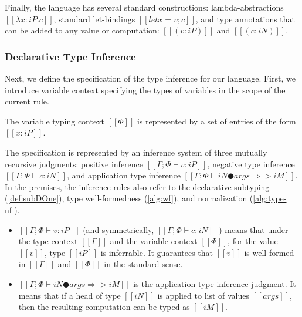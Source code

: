 Finally, the language has several standard constructions:
lambda-abstractions $[[λx:iP.c]]$,
standard let-bindings $[[let x = v; c]]$,
and type annotations that can be added to any value or computation:
$[[(v:iP)]]$ and $[[(c:iN)]]$.

\subsubsection{Declarative Type Inference}

Next, we define the specification of the type 
inference for our language. First, we introduce 
variable context specifying the types of variables 
in the scope of the current rule. 

\begin{definition}
  The variable typing context $[[Φ]]$
  is represented by a set of entries of the form
  $[[x : iP]]$. 
\end{definition}

The specification is represented by an inference system of
three mutually recursive judgments:
positive inference $[[Γ ; Φ ⊢ v : iP]]$,
negative type inference $[[Γ ; Φ ⊢ c : iN]]$, and
application type inference $[[Γ ; Φ ⊢ iN ● args ⇒> iM ]]$.
In the premises, the inference rules also refer to 
the declarative subtyping (\cref{def:subDOne}),
type well-formedness (\cref{alg:wf}), 
and normalization (\cref{alg:type-nf}).
\begin{itemize}
  \item $[[Γ ; Φ ⊢ v : iP]]$ (and symmetrically, $[[Γ ; Φ ⊢ c : iN]]$)
    means that under the type context $[[Γ]]$ and
    the variable context $[[Φ]]$, for the value $[[v]]$,
    type $[[iP]]$ is inferrable. It guarantees that 
    $[[v]]$ is well-formed in $[[Γ]]$ and $[[Φ]]$ in
    the standard sense.
  \item $[[ Γ ; Φ ⊢ iN ● args ⇒> iM ]]$ is the application type inference 
    judgment. It means that if a head of type $[[iN]]$ 
    is applied to list of values $[[args]]$, 
    then the resulting computation can be typed as $[[iM]]$.
\end{itemize}

\begin{definition}
  \hfill\\
  \label{def:declarative-typing}
  \ottdefnsDTLabeled[\apppref]{}
\end{definition}


